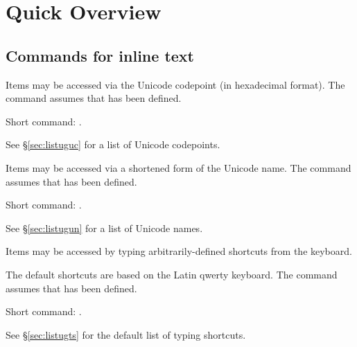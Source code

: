 \bigskip
\tableofcontents

\section{Quick Overview}
\subsection{Commands for inline text}
Items may be accessed via the Unicode codepoint (in hexadecimal format). The command assumes that \cs{\ugfont} has been defined. 

Short command: .

See \S\ref{sec:listuguc} for a list of Unicode codepoints.

Items may be accessed via a shortened form of the Unicode name. The command assumes that \cs{\ugfont} has been defined.

Short command: .

See \S\ref{sec:listugun} for a list of Unicode names.

Items may be accessed by typing arbitrarily-defined shortcuts from the keyboard. 

The default shortcuts are based on the Latin qwerty keyboard.
The command assumes that \cs{\ugfont} has been defined.

Short command: .

See \S\ref{sec:listugts} for the default list of typing shortcuts.


